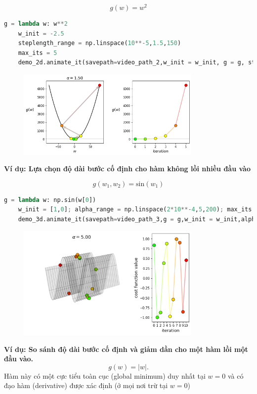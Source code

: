 \documentclass{book}
\begin{document}
\begin{equation*}
    g(w) = w^2
\end{equation*}
\begin{lstlisting}[language=python]
    g = lambda w: w**2
    w_init = -2.5
    steplength_range = np.linspace(10**-5,1.5,150)
    max_its = 5
    demo_2d.animate_it(savepath=video_path_2,w_init = w_init, g = g, steplength_range = steplength_range,max_its = max_its,tracers = 'on',version = 'unnormalized',fps=10)
\end{lstlisting}
\begin{figure}[H]
    \centering
    \includegraphics[width=0.8\textwidth]{images/fixed_steplength_selection_single_input_convex.png}
\end{figure}

\textbf{Ví dụ: Lựa chọn độ dài bước cố định cho hàm không lồi nhiều đầu vào}

\begin{equation*}
    g\left(w_1,w_2\right) = \text{sin}(w_1)
\end{equation*}
\begin{lstlisting}[language=python]
    g = lambda w: np.sin(w[0])
    w_init = [1,0]; alpha_range = np.linspace(2*10**-4,5,200); max_its = 10; view = [10,120];
    demo_3d.animate_it(savepath=video_path_3,g = g,w_init = w_init,alpha_range = alpha_range,max_its = max_its,view = view,fps=10)
\end{lstlisting}
\begin{figure}[H]
    \centering
    \includegraphics[width=0.8\textwidth]{images/fixed_steplength_selection_multi_input_non-convex.png}
\end{figure}
\textbf{Ví dụ: So sánh độ dài bước cố định và giảm dần cho một hàm lồi một đầu vào.}
\begin{equation*}
    g(w) = \left \vert w \right \vert.
\end{equation*}
Hàm này có một cực tiểu toàn cục (global minimum) duy nhất tại $w = 0$ và có đạo hàm (derivative) được xác định (ở mọi nơi trừ tại $w = 0$)
\end{document}
